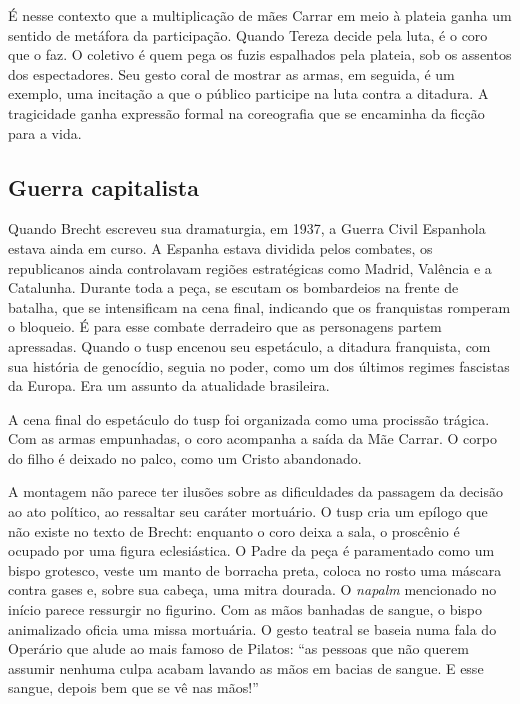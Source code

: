 É nesse contexto que a multiplicação de mães Carrar em meio à plateia
ganha um sentido de metáfora da participação. Quando Tereza decide pela
luta, é o coro que o faz. O coletivo é quem pega os fuzis espalhados
pela plateia, sob os assentos dos espectadores. Seu gesto coral de
mostrar as armas, em seguida, é um exemplo, uma incitação a que o
público participe na luta contra a ditadura. A tragicidade ganha
expressão formal na coreografia que se encaminha da ficção para a vida.


\subsection{Guerra capitalista}

Quando Brecht escreveu sua dramaturgia, em 1937, a Guerra Civil
Espanhola estava ainda em curso. A Espanha estava dividida pelos
combates, os republicanos ainda controlavam regiões estratégicas como
Madrid, Valência e a Catalunha. Durante toda a peça, se escutam os
bombardeios na frente de batalha, que se intensificam na cena final,
indicando que os franquistas romperam o bloqueio. É para esse combate
derradeiro que as personagens partem apressadas. Quando o {\sc tusp} encenou
seu espetáculo, a ditadura franquista, com sua história de genocídio,
seguia no poder, como um dos últimos regimes fascistas da Europa. Era um
assunto da atualidade brasileira.

A cena final do espetáculo do {\sc tusp} foi organizada como uma procissão
trágica. Com as armas empunhadas, o coro acompanha a saída da Mãe
Carrar. O corpo do filho é deixado no palco, como um Cristo abandonado.

A montagem não parece ter ilusões sobre as dificuldades da passagem da
decisão ao ato político, ao ressaltar seu caráter mortuário. O {\sc tusp} cria
um epílogo que não existe no texto de Brecht: enquanto o coro deixa a
sala, o proscênio é ocupado por uma figura eclesiástica. O Padre da peça
é paramentado como um bispo grotesco, veste um manto de borracha preta,
coloca no rosto uma máscara contra gases e, sobre sua cabeça, uma mitra
dourada. O {\it napalm} mencionado no início parece ressurgir no
figurino. Com as mãos banhadas de sangue, o bispo animalizado oficia uma
missa mortuária. O gesto teatral se baseia numa fala do Operário que
alude ao mais famoso de Pilatos: “as pessoas que não querem assumir
nenhuma culpa acabam lavando as mãos em bacias de sangue. E esse sangue,
depois bem que se vê nas mãos!”

